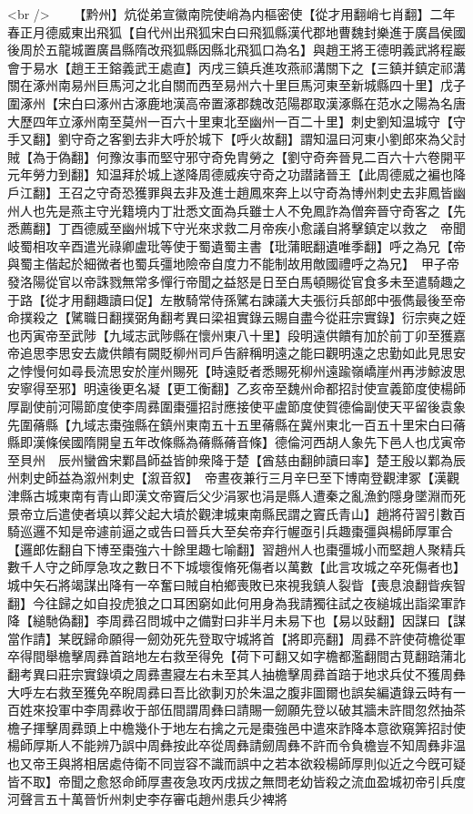 <br />
　　【黔州】炕從弟宣徽南院使峭為内樞密使【從才用翻峭七肖翻】二年春正月德威東出飛狐【自代州出飛狐宋白曰飛狐縣漢代郡地曹魏封樂進于廣昌侯國後周於五龍城置廣昌縣隋改飛狐縣因縣北飛狐口為名】與趙王將王德明義武將程巖會于易水【趙王王鎔義武王處直】丙戌三鎮兵進攻燕祁溝關下之【三鎮并鎮定祁溝關在涿州南易州巨馬河之北自關而西至易州六十里巨馬河東至新城縣四十里】戊子圍涿州【宋白曰涿州古涿鹿地漢高帝置涿郡魏改范陽郡取漢涿縣在范水之陽為名唐大歷四年立涿州南至莫州一百六十里東北至幽州一百二十里】刺史劉知温城守【守手又翻】劉守奇之客劉去非大呼於城下【呼火故翻】謂知温曰河東小劉郎來為父討賊【為于偽翻】何豫汝事而堅守邪守奇免胄勞之【劉守奇奔晉見二百六十六卷開平元年勞力到翻】知温拜於城上遂降周德威疾守奇之功譛諸晉王【此周德威之褊也降戶江翻】王召之守奇恐獲罪與去非及進士趙鳳來奔上以守奇為博州刺史去非鳳皆幽州人也先是燕主守光籍境内丁壯悉文面為兵雖士人不免鳳詐為僧奔晉守奇客之【先悉薦翻】丁酉德威至幽州城下守光來求救二月帝疾小愈議自將擊鎮定以救之　帝聞岐蜀相攻辛酉遣光祿卿盧玭等使于蜀遺蜀主書【玭蒲眠翻遺唯季翻】呼之為兄【帝與蜀主偕起於細微者也蜀兵彊地險帝自度力不能制故用敵國禮呼之為兄】　甲子帝發洛陽從官以帝誅戮無常多憚行帝聞之益怒是日至白馬頓賜從官食多未至遣騎趣之于路【從才用翻趣讀曰促】左散騎常侍孫騭右諫議大夫張衍兵部郎中張儁最後至帝命撲殺之【騭職日翻撲弼角翻考異曰梁祖實錄云賜自盡今從莊宗實錄】衍宗奭之姪也丙寅帝至武陟【九域志武陟縣在懷州東八十里】段明遠供饋有加於前丁卯至獲嘉帝追思李思安去歲供饋有闕貶柳州司戶告辭稱明遠之能曰觀明遠之忠勤如此見思安之悖慢何如尋長流思安於崖州賜死【時遠貶者悉賜死柳州遠踰嶺嶠崖州再涉鯨波思安寧得至邪】明遠後更名凝【更工衡翻】乙亥帝至魏州命都招討使宣義節度使楊師厚副使前河陽節度使李周彞圍棗彊招討應接使平盧節度使賀德倫副使天平留後袁象先圍蓨縣【九域志棗強縣在鎮州東南五十五里蓨縣在冀州東北一百五十里宋白曰蓨縣即漢條侯國隋開皇五年改條縣為蓨縣蓨音條】德倫河西胡人象先下邑人也戊寅帝至貝州　辰州蠻酋宋鄴昌師益皆帥衆降于楚【酋慈由翻帥讀曰率】楚王殷以鄴為辰州刺史師益為溆州刺史【溆音叙】　帝晝夜兼行三月辛巳至下博南登觀津冢【漢觀津縣古城東南有青山即漢文帝竇后父少涓冢也涓是縣人遭秦之亂漁釣隱身墜淵而死景帝立后遣使者填以葬父起大墳於觀津城東南縣民謂之竇氏青山】趙將苻習引數百騎巡邏不知是帝遽前逼之或告曰晉兵大至矣帝弃行幄亟引兵趣棗彊與楊師厚軍合【邏郎佐翻自下博至棗強六十餘里趣七喻翻】習趙州人也棗彊城小而堅趙人聚精兵數千人守之師厚急攻之數日不下城壞復脩死傷者以萬數【此言攻城之卒死傷者也】城中矢石將竭謀出降有一卒奮曰賊自柏鄉喪敗已來視我鎮人裂眥【喪息浪翻眥疾智翻】今往歸之如自投虎狼之口耳困窮如此何用身為我請獨往試之夜縋城出詣梁軍詐降【縋馳偽翻】李周彞召問城中之備對曰非半月未易下也【易以䜴翻】因謀曰【謀當作請】某旣歸命願得一劒効死先登取守城將首【將即亮翻】周彞不許使荷檐從軍卒得間舉檐擊周彞首踣地左右救至得免【荷下可翻又如字檐都濫翻間古莧翻踣蒲北翻考異曰莊宗實錄頃之周彞晝寢左右未至其人抽檐擊周彞首踣于地求兵仗不獲周彝大呼左右救至獲免卒睨周彞曰吾比欲剚刃於朱温之腹非圖爾也誤矣編遺錄云時有一百姓來投軍中李周彞收于部伍間謂周彝曰請賜一劒願先登以破其牆未許間忽然抽茶檐子揮擊周彞頭上中檐幾仆于地左右擒之元是棗強邑中遣來詐降本意欲窺筭招討使楊師厚斯人不能辨乃誤中周彝按此卒從周彝請劒周彝不許而令負檐豈不知周彝非温也又帝王與將相居處侍衛不同豈容不識而誤中之若本欲殺楊師厚則似近之今旣可疑皆不取】帝聞之愈怒命師厚晝夜急攻丙戌拔之無問老幼皆殺之流血盈城初帝引兵度河聲言五十萬晉忻州刺史李存審屯趙州患兵少裨將